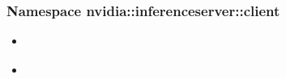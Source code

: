 \documentclass[letterpaper,10pt,english]{sphinxmanual}
\begin{document}
\subsubsection{Namespace nvidia::inferenceserver::client}
\label{\detokenize{cpp_api/namespace_nvidia__inferenceserver__client:namespace-nvidia-inferenceserver-client}}\label{\detokenize{cpp_api/namespace_nvidia__inferenceserver__client:id1}}\label{\detokenize{cpp_api/namespace_nvidia__inferenceserver__client::doc}}
\begin{sphinxShadowBox}
\begin{itemize}
\item {} 
\label{\detokenize{cpp_api/namespace_nvidia__inferenceserver__client:id2}}{\hyperref[\detokenize{cpp_api/namespace_nvidia__inferenceserver__client:classes}]{}}

\item {} 
\label{\detokenize{cpp_api/namespace_nvidia__inferenceserver__client:id3}}{\hyperref[\detokenize{cpp_api/namespace_nvidia__inferenceserver__client:functions}]{}}

\end{itemize}
\end{sphinxShadowBox}
\end{document}
